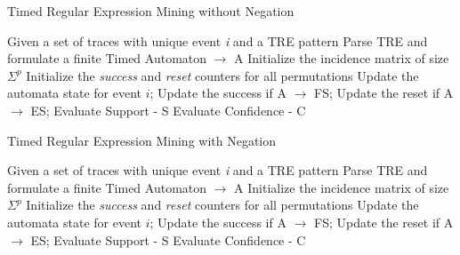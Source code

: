 \begin{algorithm}[h]
    \caption{Timed Regular Expression Mining without Negation}\label{alg:alg_without_neg}
    \begin{algorithmic}[1]
     \Require  Given a set of traces with unique event \emph{i} and a TRE pattern
     \Ensure Parse TRE and formulate a finite Timed Automaton $\rightarrow$ A
     \State Initialize the incidence matrix of size $\Sigma^p$
     \State Initialize the \emph{success} and \emph{reset} counters for all permutations
        \State Update the automata state for event $i$;
        \State Update the success if A $\rightarrow$ FS;
        \State Update the reset if A $\rightarrow$ ES;
     \EndFor
     \State Evaluate Support - S
     \State Evaluate Confidence - C
    \end{algorithmic}
\end{algorithm}


\begin{algorithm}[h]
    \caption{Timed Regular Expression Mining with Negation}\label{alg:alg_neg}
    \begin{algorithmic}[1]
     \Require  Given a set of traces with unique event \emph{i} and a TRE pattern
     \Ensure Parse TRE and formulate a finite Timed Automaton $\rightarrow$ A
     \State Initialize the incidence matrix of size $\Sigma^p$
     \State Initialize the \emph{success} and \emph{reset} counters for all permutations
        \State Update the automata state for event $i$;
        \State Update the success if A $\rightarrow$ FS;
        \State Update the reset if A $\rightarrow$ ES;
	 \EndFor
     \EndFor
     \State Evaluate Support - S
     \State Evaluate Confidence - C
    \end{algorithmic}
\end{algorithm}
